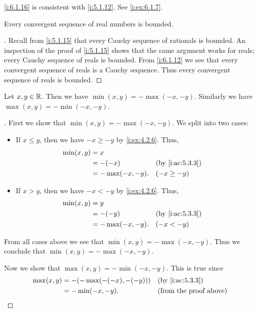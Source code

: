 \begin{note}
  \cref{i:6.1.16} is consistent with \cref{i:5.1.12}.
  See \cref{i:ex:6.1.7}.
\end{note}

\begin{cor}\label{i:6.1.17}
  Every convergent sequence of real numbers is bounded.
\end{cor}

\begin{proof}[]
  Recall from \cref{i:5.1.15} that every Cauchy sequence of rationals is bounded.
  An inspection of the proof of \cref{i:5.1.15} shows that the same argument works for reals;
  every Cauchy sequence of reals is bounded.
  From \cref{i:6.1.12} we see that every convergent sequence of reals is a Cauchy sequence.
  Thus every convergent sequence of reals is bounded.
\end{proof}

\begin{ac}\label{i:ac:6.1.1}
  Let \(x, y \in \mathbb{R}\).
  Then we have \(\min(x, y) = -\max(-x, -y)\).
  Similarly we have \(\max(x, y) = -\min(-x, -y)\).
\end{ac}

\begin{proof}[]
  First we show that \(\min(x, y) = -\max(-x, -y)\).
  We split into two cases:
  \begin{itemize}
    \item If \(x \leq y\), then we have \(-x \geq -y\) by \cref{i:ex:4.2.6}.
          Thus,
          \begin{align*}
            \min(x, y) & = x                                   \\
                       & = -(-x)          &  & \by{i:ac:5.3.3} \\
                       & = -\max(-x, -y). &  & (-x \geq -y)
          \end{align*}
    \item If \(x > y\), then we have \(-x < -y\) by \cref{i:ex:4.2.6}.
          Thus,
          \begin{align*}
            \min(x, y) & = y                                   \\
                       & = -(-y)          &  & \by{i:ac:5.3.3} \\
                       & = -\max(-x, -y). &  & (-x < -y)
          \end{align*}
  \end{itemize}
  From all cases above we see that \(\min(x, y) = -\max(-x, -y)\).
  Thus we conclude that \(\min(x, y) = -\max(-x, -y)\).

  Now we show that \(\max(x, y) = -\min(-x, -y)\).
  This is true since
  \begin{align*}
    \max(x, y) & = -(-\max(-(-x), -(-y))) &  & \by{i:ac:5.3.3}               \\
               & = -\min(-x, -y).         &  & \text{(from the proof above)}
  \end{align*}
\end{proof}


